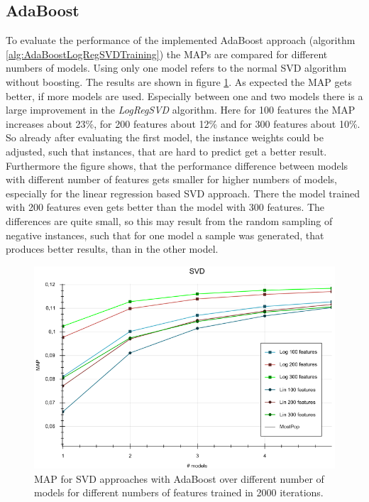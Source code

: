 \documentclass[10pt]{reportMaster}
\begin{document}
\subsection*{AdaBoost}
To evaluate the performance of the implemented AdaBoost approach (algorithm \ref{alg:AdaBoostLogRegSVDTraining}) the MAPs are compared for different numbers of models.
Using only one model refers to the normal SVD algorithm without boosting.
The results are shown in figure \ref{fig:SVDModels}.
As expected the MAP gets better, if more models are used.
Especially between one and two models there is a large improvement in the \textit{LogRegSVD} algorithm.
Here for 100 features the MAP increases about 23\%, for 200 features about 12\% and for 300 features about 10\%.
So already after evaluating the first model, the instance weights could be adjusted, such that instances, that are hard to predict get a better result. 
Furthermore the figure shows, that the performance difference between models with different number of features gets smaller for higher numbers of models, especially for the linear regression based SVD approach.
There the model trained with 200 features even gets better than the model with 300 features.
The differences are quite small, so this may result from the random sampling of negative instances, such that for one model a sample was generated, that produces better results, than in the other model.

\begin{figure}[!h]
	\centering
	\includegraphics[width=1\textwidth]{figures/experiments/SVDModels}
	\caption[MAPs for AdaBoost over number of models]{MAP for SVD approaches with AdaBoost over different number of models for different numbers of features trained in 2000 iterations.}
	\label{fig:SVDModels}
\end{figure}
\end{document}
